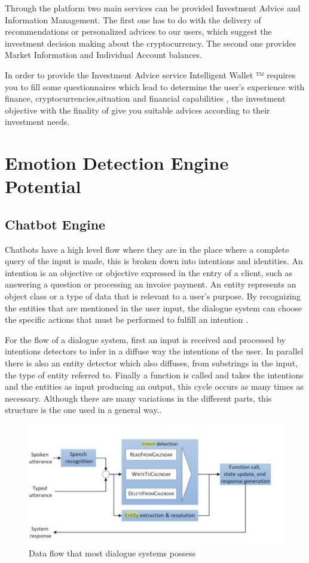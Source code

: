 \documentclass[	DIV=calc,%
							paper=letter,%
							fontsize=12pt%
                            ]{scrartcl}	 					%
\begin{document}
Through the platform two main services can be provided\: Investment Advice and Information Management. The first one has to do with the delivery of recommendations or personalized advices to our users, which suggest the investment decision making about the cryptocurrency. The second one provides Market Information and Individual Account balances.

In order to provide the Investment Advice service Intelligent Wallet ™ requires you to fill some questionnaires  which lead to determine the user's experience with finance, cryptocurrencies,situation and financial capabilities , the investment objective with the finality of give you suitable advices according to their investment needs.




\section{\label{sec:level1}Emotion Detection Engine Potential}

\subsection{\label{sec:level1}Chatbot Engine}
Chatbots have a high level flow where they are in the place where a complete query of the input is made, this is broken down into intentions and identities. An intention is an objective or objective expressed in the entry of a client, such as answering a question or processing an invoice payment. An entity represents an object class or a type of data that is relevant to a user's purpose. By recognizing the entities that are mentioned in the user input, the dialogue system can choose the specific actions that must be performed to fulfill an intention \cite{lee2015natural_sn} \cite{7419068Perzylo_sn}.

For the flow of a dialogue system, first an input is received and processed by intentions detectors to infer in a diffuse way the intentions of the user. In parallel there is also an entity detector which also diffuses, from substrings in the input, the type of entity referred to. Finally a function is called and takes the intentions and the entities as input producing an output, this cycle occurs as many times as necessary. Although there are many variations in the different parts, this structure is the one used in a general way.\cite{lee2015natural_sn}.


\begin{figure}[H]
\centering
\includegraphics[scale=1.5]{img/Pipeline.JPG}
\caption{Data flow that most dialogue systems possess}
\label{DiagIntent}
\end{figure}
\end{document}
